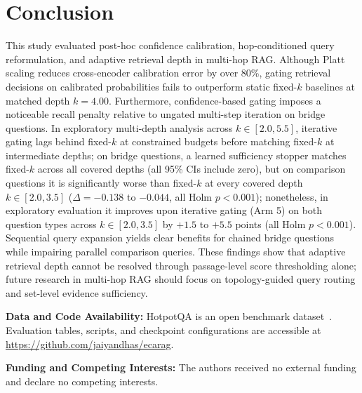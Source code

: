 \documentclass[conference]{IEEEtran}
\begin{document}
\section{Conclusion}
\label{sec:conclusion}
This study evaluated post-hoc confidence calibration, hop-conditioned query reformulation, and adaptive retrieval depth in multi-hop RAG. Although Platt scaling reduces cross-encoder calibration error by over 80\%, gating retrieval decisions on calibrated probabilities fails to outperform static fixed-$k$ baselines at matched depth $k=4.00$. Furthermore, confidence-based gating imposes a noticeable recall penalty relative to ungated multi-step iteration on bridge questions. In exploratory multi-depth analysis across $k \in [2.0, 5.5]$, iterative gating lags behind fixed-$k$ at constrained budgets before matching fixed-$k$ at intermediate depths; on bridge questions, a learned sufficiency stopper matches fixed-$k$ across all covered depths (all 95\% CIs include zero), but on comparison questions it is significantly worse than fixed-$k$ at every covered depth $k \in [2.0, 3.5]$ ($\Delta = -0.138$ to $-0.044$, all Holm $p < 0.001$); nonetheless, in exploratory evaluation it improves upon iterative gating (Arm 5) on both question types across $k \in [2.0, 3.5]$ by $+1.5$ to $+5.5$ points (all Holm $p < 0.001$). Sequential query expansion yields clear benefits for chained bridge questions while impairing parallel comparison queries. These findings show that adaptive retrieval depth cannot be resolved through passage-level score thresholding alone; future research in multi-hop RAG should focus on topology-guided query routing and set-level evidence sufficiency.

\noindent\textbf{Data and Code Availability:} HotpotQA is an open benchmark dataset~\cite{yang2018hotpotqa}. Evaluation tables, scripts, and checkpoint configurations are accessible at \url{https://github.com/jaiyandhas/ecarag}.

\vspace{1pt}
\noindent\textbf{Funding and Competing Interests:} The authors received no external funding and declare no competing interests.



\end{document}
